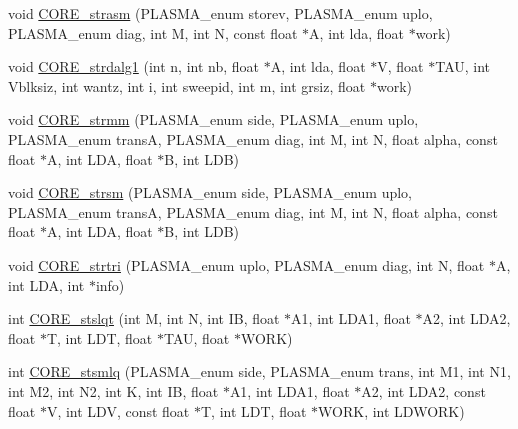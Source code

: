 \begin{DoxyCompactItemize}
\item 
void \hyperlink{group__CORE__float_ga5ca6e3b13731d4d1e970b487df8e7d00_ga5ca6e3b13731d4d1e970b487df8e7d00}{C\+O\+R\+E\+\_\+strasm} (P\+L\+A\+S\+M\+A\+\_\+enum storev, P\+L\+A\+S\+M\+A\+\_\+enum uplo, P\+L\+A\+S\+M\+A\+\_\+enum diag, int M, int N, const float $\ast$A, int lda, float $\ast$work)
\item 
void \hyperlink{group__CORE__float_ga7189182bf4d26e86bdffe3872ea47d38_ga7189182bf4d26e86bdffe3872ea47d38}{C\+O\+R\+E\+\_\+strdalg1} (int n, int nb, float $\ast$A, int lda, float $\ast$V, float $\ast$T\+A\+U, int Vblksiz, int wantz, int i, int sweepid, int m, int grsiz, float $\ast$work)
\item 
void \hyperlink{group__CORE__float_gacd23a1d66e5d76200a18fc0eced8513d_gacd23a1d66e5d76200a18fc0eced8513d}{C\+O\+R\+E\+\_\+strmm} (P\+L\+A\+S\+M\+A\+\_\+enum side, P\+L\+A\+S\+M\+A\+\_\+enum uplo, P\+L\+A\+S\+M\+A\+\_\+enum trans\+A, P\+L\+A\+S\+M\+A\+\_\+enum diag, int M, int N, float alpha, const float $\ast$A, int L\+D\+A, float $\ast$B, int L\+D\+B)
\item 
void \hyperlink{group__CORE__float_gaf4b55cc7664e685cdeb468ef18631264_gaf4b55cc7664e685cdeb468ef18631264}{C\+O\+R\+E\+\_\+strsm} (P\+L\+A\+S\+M\+A\+\_\+enum side, P\+L\+A\+S\+M\+A\+\_\+enum uplo, P\+L\+A\+S\+M\+A\+\_\+enum trans\+A, P\+L\+A\+S\+M\+A\+\_\+enum diag, int M, int N, float alpha, const float $\ast$A, int L\+D\+A, float $\ast$B, int L\+D\+B)
\item 
void \hyperlink{group__CORE__float_ga6f9045b3562c9ff5d05a041ee6cdbc47_ga6f9045b3562c9ff5d05a041ee6cdbc47}{C\+O\+R\+E\+\_\+strtri} (P\+L\+A\+S\+M\+A\+\_\+enum uplo, P\+L\+A\+S\+M\+A\+\_\+enum diag, int N, float $\ast$A, int L\+D\+A, int $\ast$info)
\item 
int \hyperlink{group__CORE__float_ga98eff3e9133754d3559ed6d038fdc6ae_ga98eff3e9133754d3559ed6d038fdc6ae}{C\+O\+R\+E\+\_\+stslqt} (int M, int N, int I\+B, float $\ast$A1, int L\+D\+A1, float $\ast$A2, int L\+D\+A2, float $\ast$T, int L\+D\+T, float $\ast$T\+A\+U, float $\ast$W\+O\+R\+K)
\item 
int \hyperlink{group__CORE__float_gaa23c627da071bd6f03c0d4dc70bddd09_gaa23c627da071bd6f03c0d4dc70bddd09}{C\+O\+R\+E\+\_\+stsmlq} (P\+L\+A\+S\+M\+A\+\_\+enum side, P\+L\+A\+S\+M\+A\+\_\+enum trans, int M1, int N1, int M2, int N2, int K, int I\+B, float $\ast$A1, int L\+D\+A1, float $\ast$A2, int L\+D\+A2, const float $\ast$V, int L\+D\+V, const float $\ast$T, int L\+D\+T, float $\ast$W\+O\+R\+K, int L\+D\+W\+O\+R\+K)
\item 

\end{DoxyCompactItemize}
